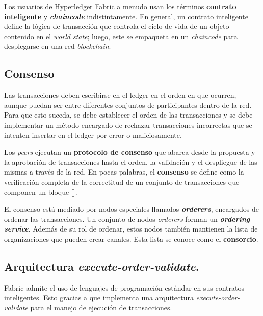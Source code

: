 Los usuarios de Hyperledger Fabric a menudo usan los términos \textbf{contrato inteligente} y \textbf{\textit{chaincode}} indistintamente. En general, un contrato inteligente define la lógica de transacción que controla el ciclo de vida de un objeto contenido en el \textit{world state}; luego, este se empaqueta en un \textit{chaincode} para desplegarse en una red \textit{blockchain}.

\subsection{Consenso}
Las transacciones deben escribirse en el ledger en el orden en que ocurren, aunque puedan ser entre diferentes conjuntos de participantes dentro de la red. Para que esto suceda, se debe establecer el orden de las transacciones y se debe implementar un método encargado de rechazar transacciones incorrectas que se intenten insertar en el ledger por error o maliciosamente.

Los \textit{peers} ejecutan un \textbf{protocolo de consenso} que abarca desde la propuesta y la aprobación de transacciones hasta el orden, la validación y el despliegue de las mismas a través de la red.
En pocas palabras, el \textbf{consenso} se define como la verificación completa de la correctitud de un conjunto de transacciones que componen un bloque [\cite{hlf-doc}].

El consenso está mediado por nodos especiales llamados \textit{\textbf{orderers}}, encargados de ordenar las transacciones. Un conjunto de nodos \textit{orderers} forman un \textbf{\textit{ordering service}}. Además de su rol de ordenar, estos nodos también mantienen la lista de organizaciones que pueden crear canales. Esta lista se conoce como el \textbf{consorcio}.


\subsection{Arquitectura \textit{execute-order-validate}.}

Fabric admite el uso de lenguajes de programación estándar en sus contratos inteligentes. Esto gracias a que implementa una arquitectura \textit{execute-order-validate} para el manejo de ejecución de transacciones.

